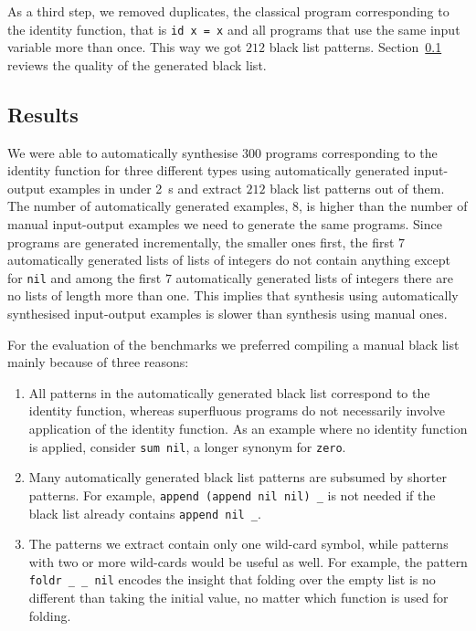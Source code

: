 As a third step, we removed duplicates, the classical program corresponding to the identity function, that is \lstinline?id x = x? and all programs that use the same input variable more than once.  This way we got $212$ black list patterns. Section~\ref{Automatic black list} reviews the quality of the generated black list.


\subsection{Results}\label{Automatic black list}
We were able to automatically synthesise $300$ programs corresponding to the identity function for three different types using automatically generated input-output examples in under \SI{2}{s} and extract $212$ black list patterns out of them.
The number of automatically generated examples, $8$, is higher than the number of manual input-output examples we need to generate the same programs. Since programs are generated incrementally, the smaller ones first, the first $7$ automatically generated lists of lists of integers do not contain anything except for \lstinline!nil! and among the first $7$ automatically generated lists of integers there are no lists of length more than one.
This implies that synthesis using automatically synthesised input-output examples is slower than synthesis using manual ones.

For the evaluation of the benchmarks we preferred compiling a manual black list mainly because of three reasons: 
\begin{enumerate}
\item All patterns in the automatically generated black list correspond to the identity function, whereas superfluous programs do not necessarily involve application of the identity function. As an example where no identity function is applied, consider \lstinline!sum nil!, a longer synonym for \lstinline!zero!.
\item Many automatically generated black list patterns are subsumed by shorter patterns. For example, \lstinline?append (append nil nil) _? is not needed if the black list already contains \lstinline?append nil _?.
\item The patterns we extract contain only one wild-card symbol, while patterns with two or more wild-cards would be useful as well. For example, the pattern \lstinline?foldr _ _ nil? encodes the insight that folding over the empty list is no different than taking the initial value, no matter which function is used for folding.
\end{enumerate}


